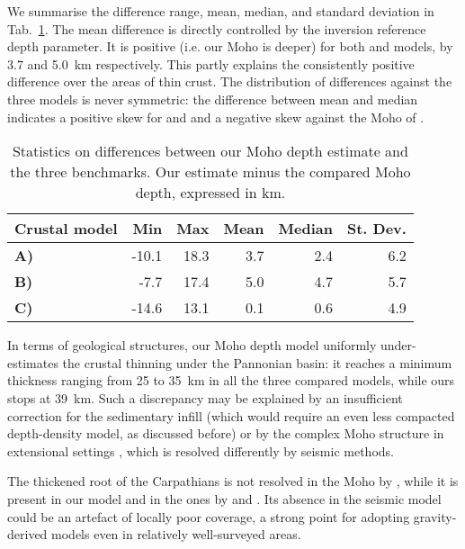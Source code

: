 {We summarise the difference range, mean, median, and standard deviation in Tab.~\ref{tab:MohoCompStats}.
The mean difference is directly controlled by the inversion reference depth parameter.
It is positive (i.e. our Moho is deeper) for both \textcite{Grad2009} and \textcite{Reguzzoni2015} models, by 3.7 and 5.0~km respectively.
This partly explains the consistently positive difference over the areas of thin crust.
The distribution of differences against the three models is never symmetric: the difference between mean and median indicates a positive skew for \textcite{Grad2009} and \textcite{Reguzzoni2015} and a negative skew against the Moho of \textcite{Pasyanos2014}.

\begin{table}
    \caption{Statistics on differences between our Moho depth estimate and the three benchmarks. Our estimate minus the compared Moho depth, expressed in \si{\kilo \metre}.}
    \begin{adjustbox}{center}
    \begingroup\setlength{\fboxsep}{0pt}
    \colorbox{tablebackground}{%
	\begin{tabular}{lrrrrr}
		\hline
		 \textbf{Crustal model} & \textbf{Min} & \textbf{Max} & \textbf{Mean} & \textbf{Median} & \textbf{St. Dev.} \\
		\hline
		\textbf{A)}~\textcite{Grad2009} & -10.1 & 18.3 & 3.7 & 2.4 & 6.2 \\
		\textbf{B)}~\textcite{Reguzzoni2015} & -7.7 & 17.4 & 5.0 & 4.7 & 5.7 \\
		\textbf{C)}~\textcite{Pasyanos2014} & -14.6 & 13.1 & 0.1 & 0.6 & 4.9 \\
		\hline
    \end{tabular}
    }\endgroup
    \end{adjustbox}
	\label{tab:MohoCompStats}
\end{table}

In terms of geological structures, our Moho depth model uniformly under-estimates the crustal thinning under the Pannonian basin: it reaches a minimum thickness ranging from 25 to 35~km in all the three compared models, while ours stops at 39~km.
Such a discrepancy may be explained by an insufficient correction for the sedimentary infill (which would require an even less compacted depth-density model, as discussed before) or by the complex Moho structure in extensional settings \parencite[e.g. due to underplating, see][]{OReilly2013}, which is resolved differently by seismic methods.

The thickened root of the Carpathians is not resolved in the Moho by \textcite{Grad2009}, while it is present in our model and in the ones by \textcite{Reguzzoni2015} and \textcite{Pasyanos2014}.
Its absence in the seismic model could be an artefact of locally poor coverage, a strong point for adopting gravity-derived models even in relatively well-surveyed areas.

}
